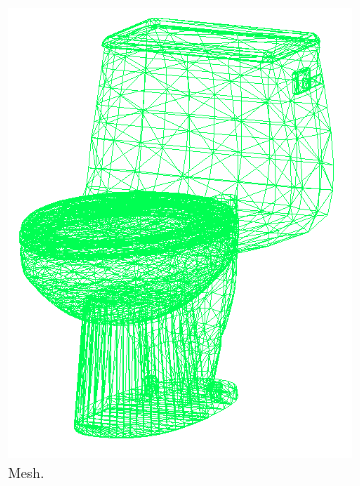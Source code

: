 \begin{figure}[!b]
\begin{subfigure}{0.32\linewidth}
    \includegraphics[width=\linewidth]{Figures/ObjRecog/toilet_off.png}
    \caption{Mesh.}
    \label{fig:objrecog:dataproc:mesh}
  \end{subfigure}
  \begin{subfigure}{0.32\linewidth}

\end{subfigure}
\end{figure}
